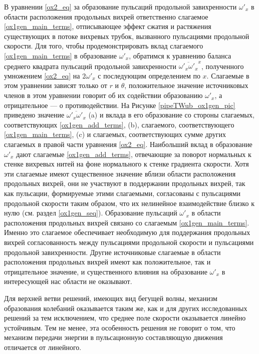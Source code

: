В уравнении \eqref{ox2_eq} за образование пульсаций продольной завихренности $\omega'_x$ в области расположения продольных вихрей ответственно слагаемое \eqref{ox1gen_main_terms}, отписывающее эффект сжатия и растяжения существующих в потоке вихревых трубок, вызванного пульсациями продольной скорости. Для того, чтобы продемонстрировать вклад слагаемого \eqref{ox1gen_main_terms} в образование $\omega'_x$, обратимся к уравнению баланса среднего квадрата пульсаций продольной завихренности $\overline{\omega'_x\omega'_x}^x$, полученного умножением \eqref{ox2_eq} на $2\omega'_x$ с последующим определением по $x$. Слагаемые в этом уравнении зависят только от $r$ и $\theta$, положительное значение источниковых членов в этом уравнении говорит об их содействии образованию $\omega'_x$, а отрицательное --- о противодействии. На Рисунке \ref{pipeTWub_ox1gen_pic} приведено значение $\overline{\omega'_x\omega'_x}$ (a) и вклада в его образование со стороны слагаемых, соответствующих \eqref{ox1gen_add_terms}, (b), слагаемого, соответствующего \eqref{ox1gen_main_terms}, (c) и слагаемых, соответствующих сумме других слагаемых в правой части уравнения \eqref{ox2_eq}. Наибольший вклад в образование $\omega'_x$ дают слагаемые \eqref{ox1gen_add_terms}, отвечающие за поворот нормальных к стенке вихревых нитей на фоне нормального к стенке градиента скорости. Хотя эти слагаемые имеют существенное значение вблизи области расположения продольных вихрей, они не участвуют в поддержании продольных вихрей, так как пульсации, формируемые этими слагаемыми, согласованы с пульсациями продольной скорости таким образом, что их нелинейное взаимодействие близко к нулю (см. раздел \ref{ox1gen_seq}). Образование пульсаций $\omega'_x$ в области расположения продольных вихрей связано со слагаемым \eqref{ox1gen_main_terms}. Именно это слагаемое обеспечивает необходимую для поддержания продольных вихрей согласованность между пульсациями продольной скорости и пульсациями продольной завихренности. Другие источниковые слагаемые в области расположения продольных вихрей имеют как положительное, так и отрицательное значение, и существенного влияния на образование $\omega'_x$ в интересующей нас области не оказывают. 

Для верхней ветви решений, имеющих вид бегущей волны, механизм образования колебаний оказывается таким же, как и для других исследованных решений за тем исключением, что среднее поле скорости оказывается линейно устойчивым. Тем не менее, эта особенность решения не говорит о том, что механизм передачи энергии в пульсационную составляющую движения отличается от линейного. 



